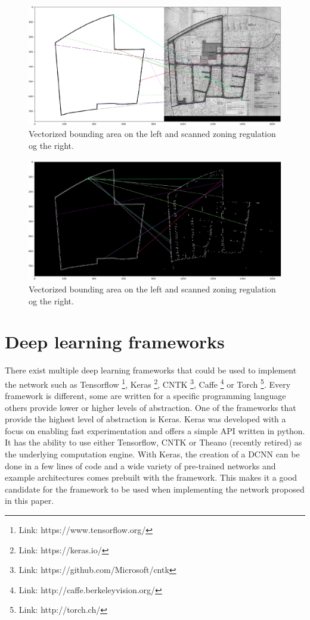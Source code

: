 \begin{figure}[H]
    \centering
    \includegraphics[width=0.8\linewidth]{fig/test1.png}
    \caption{Vectorized bounding area on the left and scanned zoning regulation og the right.}
    \label{fig:test1}
\end{figure}

\begin{figure}[H]
    \centering
    \includegraphics[width=0.8\linewidth]{fig/test1-thresh.png}
    \caption{Vectorized bounding area on the left and scanned zoning regulation og the right.}
    \label{fig:thresh}
\end{figure}

\section{Deep learning frameworks}
There exist multiple deep learning frameworks that could be used to implement the network such as Tensorflow \footnote{Link: https://www.tensorflow.org/}, Keras \footnote{Link: https://keras.io/}, CNTK \footnote{Link: https://github.com/Microsoft/cntk}, Caffe \footnote{Link: http://caffe.berkeleyvision.org/} or Torch \footnote{Link: http://torch.ch/}.  Every framework is different, some are written for a specific programming language others provide lower or higher levels of abstraction. One of the frameworks that provide the highest level of abstraction is Keras. Keras was developed with a focus on enabling fast experimentation and offers a simple API written in python. It has the ability to use either Tensorflow, CNTK or Theano (recently retired) as the underlying computation engine. With Keras, the creation of a DCNN can be done in a few lines of code and a wide variety of pre-trained networks and example architectures comes prebuilt with the framework. This makes it a good candidate for the framework to be used when implementing the network proposed in this paper. 


